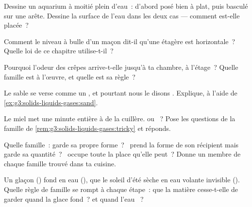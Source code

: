 \begin{exercise}[$\star$]\label{exo:g3:solids-liquids-gases:4}
Dessine un aquarium à moitié plein d'eau~: d'abord posé bien à plat,
puis basculé sur une arête. Dessine la surface de l'eau dans les deux
cas --- comment est-elle placée~?
\end{exercise}

\begin{exercise}[$\star$]\label{exo:g3:solids-liquids-gases:5}
Comment le niveau à bulle d'un maçon dit-il qu'une étagère est
horizontale~? Quelle loi de ce chapitre utilise-t-il~?
\end{exercise}

\begin{exercise}[$\star$]\label{exo:g3:solids-liquids-gases:6}
Pourquoi l'odeur des crêpes arrive-t-elle jusqu'à ta chambre, à
l'étage~? Quelle famille est à l'œuvre, et quelle est sa règle~?
\end{exercise}

\begin{exercise}[$\star$]\label{exo:g3:solids-liquids-gases:7}
Le sable se verse comme un , et pourtant nous le disons
. Explique, à l'aide de \cref{ex:g3:solids-liquids-gases:sand}.
\end{exercise}

\begin{exercise}[$\star$]\label{exo:g3:solids-liquids-gases:8}
Le miel met une minute entière à  de la cuillère.  ou
~? Pose les questions de la famille de
\cref{rem:g3:solids-liquids-gases:tricky} et réponds.
\end{exercise}

\begin{exercise}[$\star$]\label{exo:g3:solids-liquids-gases:9}
Quelle famille~: garde sa propre forme~? \ prend la forme de son
récipient mais garde sa quantité~? \ occupe toute la place qu'elle
peut~? Donne un membre de chaque famille trouvé dans ta cuisine.
\end{exercise}

\begin{exercise}[$\star\star$]\label{exo:g3:solids-liquids-gases:10}
Un glaçon () fond en eau (), que le soleil d'été sèche
en eau volante invisible (). Quelle règle de famille se rompt à
chaque étape~: que la matière cesse-t-elle de garder quand la glace
fond~? et quand l'eau ~?
\end{exercise}

